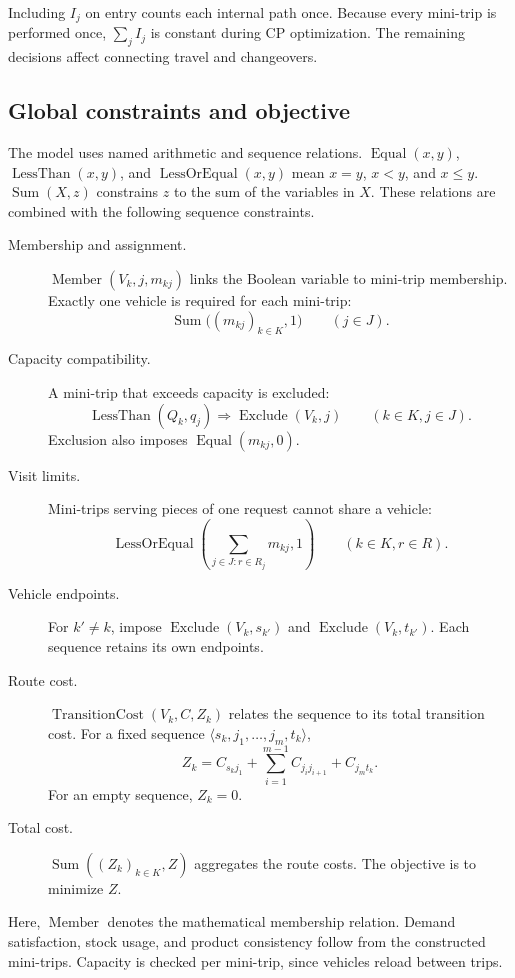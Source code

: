 Including $I_j$ on entry counts each internal path once. Because every mini-trip
is performed once, $\sum_jI_j$ is constant during CP optimization. The remaining
decisions affect connecting travel and changeovers.

\subsection{Global constraints and objective}
The model uses named arithmetic and sequence relations.
$\operatorname{Equal}(x,y)$, $\operatorname{LessThan}(x,y)$, and
$\operatorname{LessOrEqual}(x,y)$ mean $x=y$, $x<y$, and $x\leq y$.
$\operatorname{Sum}(X,z)$ constrains $z$ to the sum of the variables in $X$.
These relations are combined with the following sequence constraints.

\begin{description}
\item[Membership and assignment.]
$\operatorname{Member}(V_k,j,m_{kj})$ links the Boolean variable to mini-trip
membership. Exactly one vehicle is required for each mini-trip:
\[
\operatorname{Sum}\bigl((m_{kj})_{k\in K},1\bigr)\qquad(j\in J).
\]
\item[Capacity compatibility.]
A mini-trip that exceeds capacity is excluded:
\[
\operatorname{LessThan}(Q_k,q_j)\Rightarrow\operatorname{Exclude}(V_k,j)
\qquad(k\in K,j\in J).
\]
Exclusion also imposes $\operatorname{Equal}(m_{kj},0)$.
\item[Visit limits.]
Mini-trips serving pieces of one request cannot share a vehicle:
\[
\operatorname{LessOrEqual}\left(\sum_{j\in J:r\in R_j}m_{kj},1\right)
\qquad(k\in K,r\in R).
\]
\item[Vehicle endpoints.]
For $k'\neq k$, impose $\operatorname{Exclude}(V_k,s_{k'})$ and
$\operatorname{Exclude}(V_k,t_{k'})$. Each sequence retains its own endpoints.
\item[Route cost.]
$\operatorname{TransitionCost}(V_k,C,Z_k)$ relates the sequence to its total
transition cost. For a fixed sequence $\langle s_k,j_1,\ldots,j_m,t_k\rangle$,
\[
Z_k=C_{s_kj_1}+\sum_{i=1}^{m-1}C_{j_i j_{i+1}}+C_{j_mt_k}.
\]
For an empty sequence, $Z_k=0$.
\item[Total cost.]
$\operatorname{Sum}((Z_k)_{k\in K},Z)$ aggregates the route costs.
The objective is to minimize $Z$.
\end{description}

Here, $\operatorname{Member}$ denotes the mathematical membership relation.
Demand satisfaction, stock usage, and product consistency follow from the
constructed mini-trips. Capacity is checked per mini-trip, since vehicles
reload between trips.

